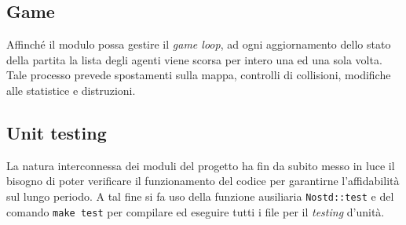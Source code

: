 \documentclass[a4paper]{article}
\begin{document}
\subsection{Game}

Affinch\'e il modulo possa gestire il \emph{game loop}, ad ogni aggiornamento
dello stato della partita la lista degli agenti viene scorsa per intero una ed
una sola volta. Tale processo prevede spostamenti sulla mappa, controlli di
collisioni, modifiche alle statistice e distruzioni.

\subsection{Unit testing}

La natura interconnessa dei moduli del progetto ha fin da subito messo in luce
il bisogno di poter verificare il funzionamento del codice per garantirne
l'affidabilit\`a sul lungo periodo. A tal fine si fa uso della funzione
ausiliaria \verb!Nostd::test! e del comando \verb!make test! per compilare ed
eseguire tutti i file per il \emph{testing} d'unit\`a.
\end{document}

